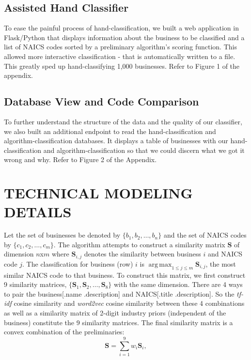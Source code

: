 \documentclass[letterpaper, 10 pt, conference]{IEEEtran}
\DeclareMathOperator*{\argmax}{arg\,max}
\newcommand{\matr}[1]{\mathbf{#1}}
\begin{document}
\subsection{Assisted Hand Classifier}

To ease the painful process of hand-classification, we built a web application in Flask/Python that displays information about the business to be classified and a list of NAICS codes sorted by a preliminary algorithm's scoring function. This allowed more interactive classification - that is automatically written to a file. This greatly sped up hand-classifying 1,000 businesses. Refer to Figure 1 of the appendix.

\subsection{Database View and Code Comparison}

To further understand the structure of the data and the quality of our classifier, we also built an additional endpoint to read the hand-classification and algorithm-classification databases. It displays a table of businesses with our hand-classification and algorithm-classification so that we could discern what we got it wrong and why. Refer to Figure 2 of the Appendix.

\section{TECHNICAL MODELING DETAILS}

Let the set of businesses be denoted by $\{b_1,b_2,\dots,b_n\}$ and the set of NAICS codes by $\{c_1,c_2,\dots,c_m\}$. The algorithm attempts to construct a similarity matrix $\matr{S}$ of dimension $n$x$m$ where $\matr{S}_{i,j}$ denotes the similarity between business $i$ and NAICS code $j$. The classification for business (row) $i$ is $\argmax_{1 \leq j \leq m} \matr{S}_{i,j}$, the most similar NAICS code to that business. To construct this matrix, we first construct 9 similarity matrices, $\{\matr{S}_1,\matr{S}_2,\dots,\matr{S}_8\}$ with the same dimension. There are 4 ways to pair the business[.name .description] and NAICS[.title .description]. So the \textit{tf-idf} cosine similarity and \textit{word2vec} cosine similarity between these 4 combinations as well as a similarity matrix of 2-digit industry priors (independent of the business) constitute the 9 similarity matrices. The final similarity matrix is a convex combination of the preliminaries: \[ \matr{S} = \sum_{i=1}^9 w_i \matr{S}_i, \]
\end{document}
